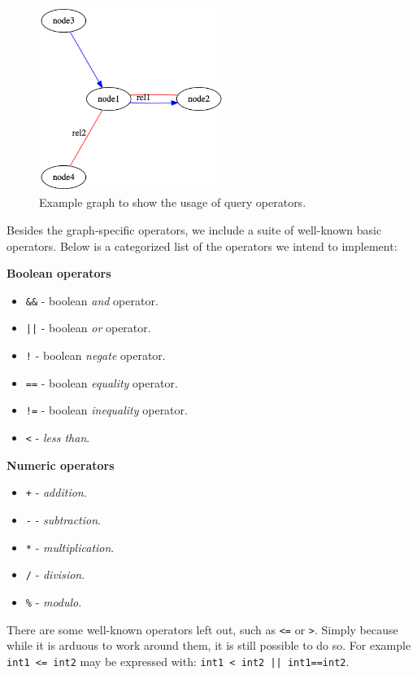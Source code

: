 \begin{figure}[H]
    \centering
    \includegraphics[width=6cm]{figures/syntax_section/syntax_query_operators}
    \caption{Example graph to show the usage of query operators.}
    \label{fig:syntax_query_operators_example_out}
\end{figure}

Besides the graph-specific operators, we include a suite of well-known basic operators.
Below is a categorized list of the operators we intend to implement:


\textbf{Boolean operators}
\begin{itemize}
    \item \lstinline{&&} - boolean \emph{and} operator.
    \item \lstinline{||} - boolean \emph{or} operator.
    \item \lstinline{!} - boolean \emph{negate} operator.
    \item \lstinline{==} - boolean \emph{equality} operator.
    \item \lstinline{!=} - boolean \emph{inequality} operator.
    \item \lstinline{<} - \emph{less than}.
\end{itemize}

\textbf{Numeric operators}
\begin{itemize}
    \item \lstinline{+} - \emph{addition}.
    \item \lstinline{-} - \emph{subtraction}.
    \item \lstinline{*} - \emph{multiplication}.
    \item \lstinline{/} - \emph{division}.
    \item \lstinline{%} - \emph{modulo}.
\end{itemize}

There are some well-known operators left out, such as \lstinline{<=} or \lstinline{>}.
Simply because while it is arduous to work around them, it is still possible to do so.
For example  \lstinline{int1 <= int2} may be expressed with:  \lstinline{int1 < int2 || int1==int2}.

